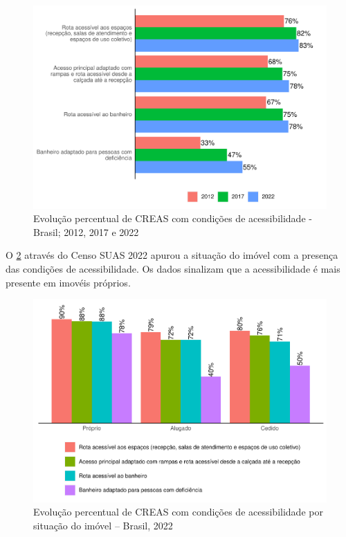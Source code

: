 \documentclass[
  brazilian]{report}
\begin{document}
\begin{figure}
\includegraphics{Censo-SUAS-2022_files/figure-latex/creas-acessibilidade-1} \caption[Evolução percentual de CREAS com condições de acessibilidade - Brasil]{Evolução percentual de CREAS com condições de acessibilidade - Brasil; 2012, 2017 e 2022}\label{fig:creas-acessibilidade}
\end{figure}

O \cref{fig:CREAS-acessibilidade-situacao} através do Censo SUAS 2022
apurou a situação do imóvel com a presença das condições de
acessibilidade. Os dados sinalizam que a acessibilidade é mais presente
em imovéis próprios.

\begin{figure}
\includegraphics{Censo-SUAS-2022_files/figure-latex/CREAS-acessibilidade-situacao-1} \caption[Evolução percentual de CREAS com condições de acessibilidade por situação do imóvel – Brasil, 2022]{Evolução percentual de CREAS com condições de acessibilidade por situação do imóvel – Brasil, 2022}\label{fig:CREAS-acessibilidade-situacao}
\end{figure}
\end{document}
